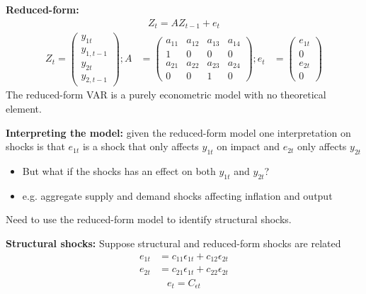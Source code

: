 \documentclass{beamer}
\begin{document}
\begin{frame}
  \textbf{Reduced-form:}
  \begin{align*}
    Z_t = AZ_{t-1} + e_t 
  \end{align*}
  \begin{align}
      Z_t= \begin{pmatrix}
      y_{1t} \\ y_{1,t-1} \\ y_{2t} \\ y_{2,t-1}    
      \end{pmatrix};
      A & = \begin{pmatrix}
        a_{11} & a_{12} & a_{13} & a_{14}\\
        1      & 0      & 0      & 0\\
        a_{21} & a_{22} & a_{23} & a_{24}\\
        0      & 0      & 1      & 0    
      \end{pmatrix};
      e_t &= \begin{pmatrix}
        e_{1t} \\ 0 \\ e_{2t} \\ 0 
      \end{pmatrix}
    \end{align}
    \medskip
    The reduced-form VAR is a purely econometric model with no theoretical element.     
\end{frame}

\begin{frame}
  \textbf{Interpreting the model:} given the reduced-form model one interpretation on shocks is that $e_{1t}$ is a shock that only affects $y_{1t}$ on impact and $e_{2t}$ only affects $y_{2t}$
  \begin{itemize}
    \item But what if the shocks has an effect on both $y_{1t}$ and $y_{2t}$?
    \item e.g. aggregate supply and demand shocks affecting inflation and output
  \end{itemize}
  \medskip
  Need to use the reduced-form model to identify structural shocks.
\end{frame}

\begin{frame}
  \textbf{Structural shocks:} Suppose structural and reduced-form shocks are related
  \begin{align}
      e_{1t}&= c_{11}\epsilon_{1t} + c_{12}\epsilon_{2t}\\ \nonumber
      e_{2t}&= c_{21}\epsilon_{1t} + c_{22}\epsilon_{2t}  
  \end{align}
  \begin{align}  
      e_t= C_{\epsilon t} 
  \end{align}
\end{frame}
\end{document}
